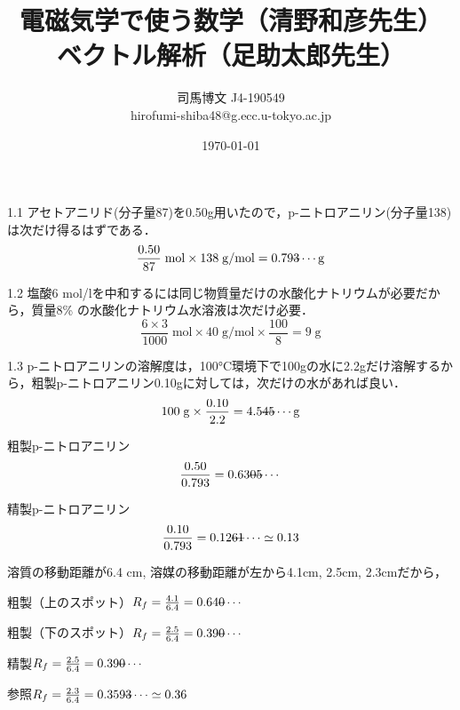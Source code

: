 \documentclass[uplatex, 12pt, dvipdfmx]{jsarticle}
\title{電磁気学で使う数学（清野和彦先生）\\ ベクトル解析（足助太郎先生）}
\author{司馬博文 J4-190549\\hirofumi-shiba48@g.ecc.u-tokyo.ac.jp}
\date{\today}
\begin{document}
1.1 アセトアニリド(分子量87)を0.50g用いたので，p-ニトロアニリン(分子量138)は次だけ得るはずである．
\[ \frac{0.50}{87} \;\si{\mole}\times 138 \;\mathrm{g}/\si{\mole} = 0.79\hbox{\sout{3}}\cdots \mathrm{g} \]

1.2 塩酸6 mol/lを中和するには同じ物質量だけの水酸化ナトリウムが必要だから，質量8\% の水酸化ナトリウム水溶液は次だけ必要．
\[ \frac{6\times 3}{1000}\;\si{\mole}\times 40\; \mathrm{g}/\si{\mole}\times\frac{100}{8} = 9\;\mathrm{g} \]

1.3 p-ニトロアニリンの溶解度は，100\si{\degreeCelsius}環境下で100gの水に2.2gだけ溶解するから，粗製p-ニトロアニリン0.10gに対しては，次だけの水があれば良い．
\[ 100\;\mathrm{g}\times \frac{0.10}{2.2} = 4.5\hbox{\sout{45}}\cdots\mathrm{g} \]


粗製p-ニトロアニリン
\[\frac{0.50}{0.793}=0.63\hbox{\sout{05}}\cdots \]

精製p-ニトロアニリン
\[\frac{0.10}{0.793}=0.12\hbox{\sout{61}}\cdots \simeq 0.13 \]

溶質の移動距離が6.4 cm, 溶媒の移動距離が左から4.1cm, 2.5cm, 2.3cmだから，

粗製（上のスポット）$R_f=\frac{4.1}{6.4}=0.64\hbox{\sout{0}}\cdots$

粗製（下のスポット）$R_f=\frac{2.5}{6.4}=0.39\hbox{\sout{0}}\cdots$

精製$R_f=\frac{2.5}{6.4}=0.39\hbox{\sout{0}}\cdots$

参照$R_f=\frac{2.3}{6.4}=0.359\hbox{\sout{3}}\cdots\simeq 0.36$
\end{document}
